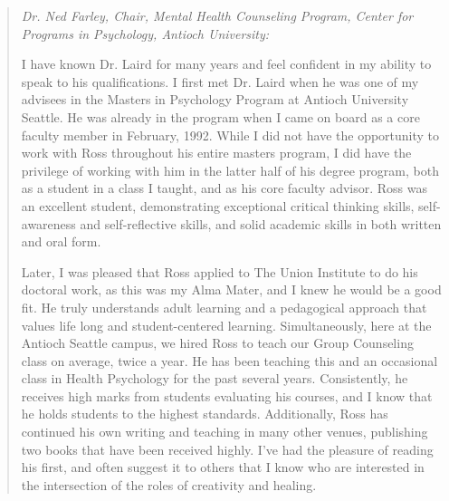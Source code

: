 \documentclass[10pt,DIV09,letterpaper,oneside,headsepline]{scrreprt}
\begin{document}
\begin{quotation}

\textit{Dr. Ned Farley, Chair, Mental Health Counseling Program, Center for Programs in Psychology, Antioch University:\\}

I have known Dr. Laird for many years and feel confident in my ability to speak to his qualifications. I first met Dr. Laird when he was one of my advisees in the Masters in Psychology Program at Antioch University Seattle. He was already in the program when I came on board as a core faculty member in February, 1992. While I did not have the opportunity to work with Ross throughout his entire masters program, I did have the privilege of working with him in the latter half of his degree program, both as a student in a class I taught, and as his core faculty advisor. Ross was an excellent student, demonstrating exceptional critical thinking skills, self-awareness and self-reflective skills, and solid academic skills in both written and oral form. 

Later, I was pleased that Ross applied to The Union Institute to do his doctoral work, as this was my Alma Mater, and I knew he would be a good fit. He truly understands adult learning and a pedagogical approach that values life long and student-centered learning. Simultaneously, here at the Antioch Seattle campus, we hired Ross to teach our Group Counseling class on average, twice a year. He has been teaching this and an occasional class in Health Psychology for the past several years. Consistently, he receives high marks from students evaluating his courses, and I know that he holds students to the highest standards. Additionally, Ross has continued his own writing and teaching in many other venues, publishing two books that have been received highly. I've had the pleasure of reading his first, and often suggest it to others that I know who are interested in the intersection of the roles of creativity and healing.

\end{quotation}
\bigskip
\end{document}
